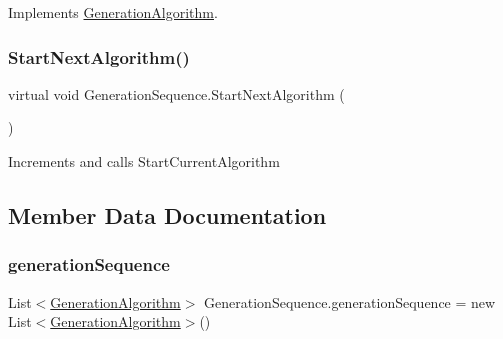 Implements \mbox{\hyperlink{class_generation_algorithm_a5e891b08f0c1d8f4ccc9ad06667691ec}{Generation\+Algorithm}}.

\mbox{\label{class_generation_sequence_afdce2edf1188afcaf018d67010c127c4}} 
\subsubsection{\texorpdfstring{Start\+Next\+Algorithm()}{StartNextAlgorithm()}}
{\footnotesize\ttfamily virtual void Generation\+Sequence.\+Start\+Next\+Algorithm (\begin{DoxyParamCaption}{ }\end{DoxyParamCaption})\hspace{0.3cm}{\ttfamily [virtual]}}



Increments  and calls Start\+Current\+Algorithm 



\subsection{Member Data Documentation}
\mbox{\label{class_generation_sequence_a4e4b450952479c6d089c47ad514f15ae}} 
\subsubsection{\texorpdfstring{generation\+Sequence}{generationSequence}}
{\footnotesize\ttfamily List$<$\mbox{\hyperlink{class_generation_algorithm}{Generation\+Algorithm}}$>$ Generation\+Sequence.\+generation\+Sequence = new List$<$\mbox{\hyperlink{class_generation_algorithm}{Generation\+Algorithm}}$>$()}

\mbox{\label{class_generation_sequence_ad8f5b50dde07c78b79462dcd23b7cfde}} 
